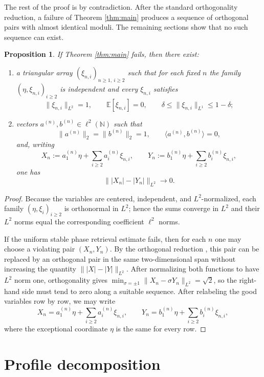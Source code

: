\documentclass[11pt]{amsart}
\newtheorem{proposition}[theorem]{Proposition}
\newcommand{\E}{\mathbb E}
\newcommand{\N}{\mathbb N}
\begin{document}
The rest of the proof is by contradiction. After the standard orthogonality
reduction, a failure of Theorem \ref{thm:main} produces a sequence of
orthogonal pairs with almost identical moduli. The remaining sections show
that no such sequence can exist.

\begin{proposition}\label{prop:counterexample-array}
If Theorem \ref{thm:main} fails, then there exist:
\begin{enumerate}[label=\rm(\roman*)]
\item a triangular array $(\xi_{n,i})_{n \ge 1,\ i \ge 2}$ such that for each
fixed $n$ the family $(\eta,\xi_{n,i})_{i \ge 2}$ is independent and every
$\xi_{n,i}$ satisfies
\[
\|\xi_{n,i}\|_{L^2} = 1,
\qquad
\E[\xi_{n,i}] = 0,
\qquad
\delta \le \|\xi_{n,i}\|_{L^1} \le 1-\delta;
\]
\item vectors $a^{(n)}, b^{(n)} \in \ell^2(\N)$ such that
\[
\|a^{(n)}\|_2 = \|b^{(n)}\|_2 = 1,
\qquad
\langle a^{(n)}, b^{(n)} \rangle = 0,
\]
and, writing
\[
X_n := a_1^{(n)}\eta + \sum_{i \ge 2} a_i^{(n)} \xi_{n,i},
\qquad
Y_n := b_1^{(n)}\eta + \sum_{i \ge 2} b_i^{(n)} \xi_{n,i},
\]
one has
\[
\bigl\| |X_n|-|Y_n| \bigr\|_{L^2} \longrightarrow 0.
\]
\end{enumerate}
\end{proposition}

\begin{proof}
Because the variables are centered, independent, and $L^2$-normalized, each
family $(\eta,\xi_i)_{i \ge 2}$ is orthonormal in $L^2$; hence the sums
converge in $L^2$ and their $L^2$ norms equal the corresponding coefficient
$\ell^2$ norms.

If the uniform stable phase retrieval estimate fails, then for each $n$ one
may choose a violating pair $(X_n,Y_n)$. By the orthogonal reduction
\cite[Theorem~3.9]{FOTP}, this pair can be replaced by an orthogonal pair
in the same two-dimensional span without increasing the quantity
$\bigl\| |X|-|Y| \bigr\|_{L^2}$. After normalizing both functions to have
$L^2$ norm one, orthogonality gives
$\min_{\sigma=\pm 1}\|X_n-\sigma Y_n\|_{L^2}=\sqrt{2}$, so the right-hand
side must tend to zero along a suitable sequence. After relabeling the good
variables row by row, we may write
\[
X_n = a_1^{(n)}\eta + \sum_{i \ge 2} a_i^{(n)} \xi_{n,i},
\qquad
Y_n = b_1^{(n)}\eta + \sum_{i \ge 2} b_i^{(n)} \xi_{n,i},
\]
where the exceptional coordinate $\eta$ is the same for every row.
\end{proof}

\section{Profile decomposition}
\end{document}
